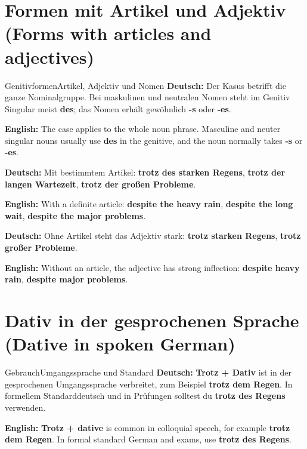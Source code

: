 \documentclass[a4paper,11pt]{article}
\newcommand{\GermanText}[1]{\textbf{Deutsch: }#1\par}
\newcommand{\EnglishText}[1]{{\small\color{SoftGray}\textbf{English: }#1\par}}
\begin{document}
\section{Formen mit Artikel und Adjektiv \textnormal{(Forms with articles and adjectives)}}
\begin{grammarentry}{Genitivformen}{Artikel, Adjektiv und Nomen}
\GermanText{Der Kasus betrifft die ganze Nominalgruppe. Bei maskulinen und neutralen Nomen steht im Genitiv Singular meist \textbf{des}; das Nomen erhält gewöhnlich \textbf{-s} oder \textbf{-es}.}
\EnglishText{The case applies to the whole noun phrase. Masculine and neuter singular nouns usually use \textbf{des} in the genitive, and the noun normally takes \textbf{-s} or \textbf{-es}.}
\GermanText{Mit bestimmtem Artikel: \textbf{trotz des starken Regens}, \textbf{trotz der langen Wartezeit}, \textbf{trotz der großen Probleme}.}
\EnglishText{With a definite article: \textbf{despite the heavy rain}, \textbf{despite the long wait}, \textbf{despite the major problems}.}
\GermanText{Ohne Artikel steht das Adjektiv stark: \textbf{trotz starken Regens}, \textbf{trotz großer Probleme}.}
\EnglishText{Without an article, the adjective has strong inflection: \textbf{despite heavy rain}, \textbf{despite major problems}.}
\end{grammarentry}

\section{Dativ in der gesprochenen Sprache \textnormal{(Dative in spoken German)}}
\begin{grammarentry}{Gebrauch}{Umgangssprache und Standard}
\GermanText{\textbf{Trotz + Dativ} ist in der gesprochenen Umgangssprache verbreitet, zum Beispiel \textbf{trotz dem Regen}. In formellem Standarddeutsch und in Prüfungen solltest du \textbf{trotz des Regens} verwenden.}
\EnglishText{\textbf{Trotz + dative} is common in colloquial speech, for example \textbf{trotz dem Regen}. In formal standard German and exams, use \textbf{trotz des Regens}.}
\end{grammarentry}
\end{document}
